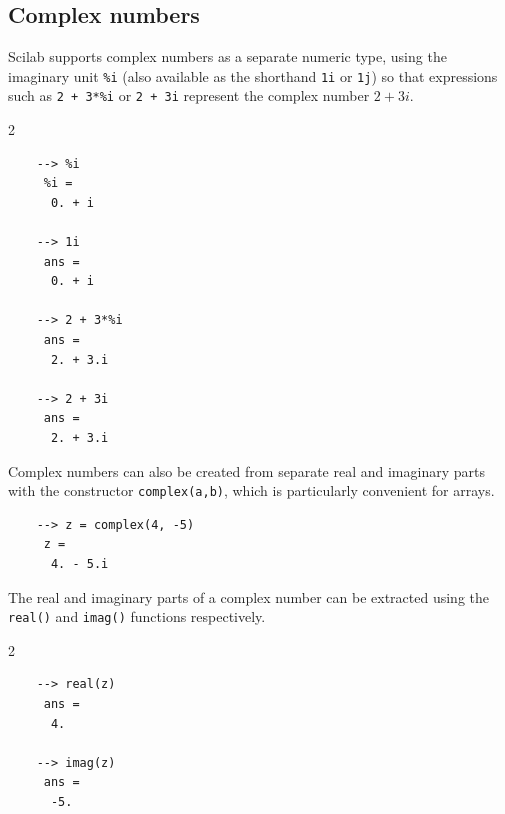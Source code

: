	\subsection{Complex numbers}
		Scilab supports complex numbers as a separate numeric type, using the imaginary unit \texttt{\%i} (also available as the shorthand \texttt{1i} or \texttt{1j}) so that expressions such as \texttt{2 + 3*\%i} or \texttt{2 + 3i} represent the complex number $2+3i$.
		\begin{multicols}{2}
		\begin{verbatim}
	--> %i
	 %i =
	  0. + i
	
	--> 1i
	 ans =
	  0. + i
	
	--> 2 + 3*%i
	 ans =
	  2. + 3.i
	
	--> 2 + 3i
	 ans =
	  2. + 3.i
		\end{verbatim}
		\end{multicols}
		
		Complex numbers can also be created from separate real and imaginary parts with the constructor \texttt{complex(a,b)}, which is particularly convenient for arrays.
		\begin{verbatim}
	--> z = complex(4, -5)
	 z =     
	  4. - 5.i
		\end{verbatim}
		
		The real and imaginary parts of a complex number can be extracted using the \texttt{real()} and \texttt{imag()} functions respectively.
		\begin{multicols}{2}
		\begin{verbatim}
	--> real(z)
	 ans =
	  4.
	
	--> imag(z)
	 ans =
	  -5.
		\end{verbatim}
		\end{multicols}